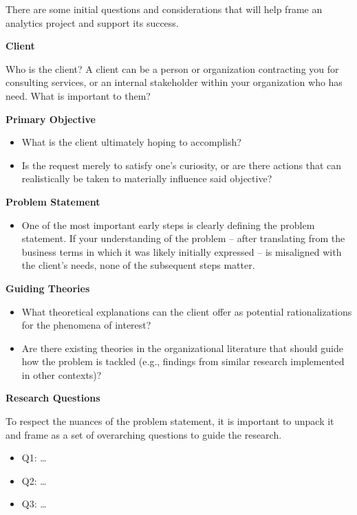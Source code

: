 \documentclass[
]{book}
\providecommand{\tightlist}{%
  \setlength{\itemsep}{0pt}\setlength{\parskip}{0pt}}
\begin{document}
There are some initial questions and considerations that will help frame an analytics project and support its success.

\textbf{Client}

Who is the client? A client can be a person or organization contracting you for consulting services, or an internal stakeholder within your organization who has need. What is important to them?

\textbf{Primary Objective}

\begin{itemize}
\tightlist
\item
  What is the client ultimately hoping to accomplish?
\item
  Is the request merely to satisfy one's curiosity, or are there actions that can realistically be taken to materially influence said objective?
\end{itemize}

\textbf{Problem Statement}

\begin{itemize}
\tightlist
\item
  One of the most important early steps is clearly defining the problem statement. If your understanding of the problem -- after translating from the business terms in which it was likely initially expressed -- is misaligned with the client's needs, none of the subsequent steps matter.
\end{itemize}

\textbf{Guiding Theories}

\begin{itemize}
\tightlist
\item
  What theoretical explanations can the client offer as potential rationalizations for the phenomena of interest?
\item
  Are there existing theories in the organizational literature that should guide how the problem is tackled (e.g., findings from similar research implemented in other contexts)?
\end{itemize}

\textbf{Research Questions}

To respect the nuances of the problem statement, it is important to unpack it and frame as a set of overarching questions to guide the research.

\begin{itemize}
\tightlist
\item
  Q1: \ldots{}
\item
  Q2: \ldots{}
\item
  Q3: \ldots{}
\end{itemize}
\end{document}
